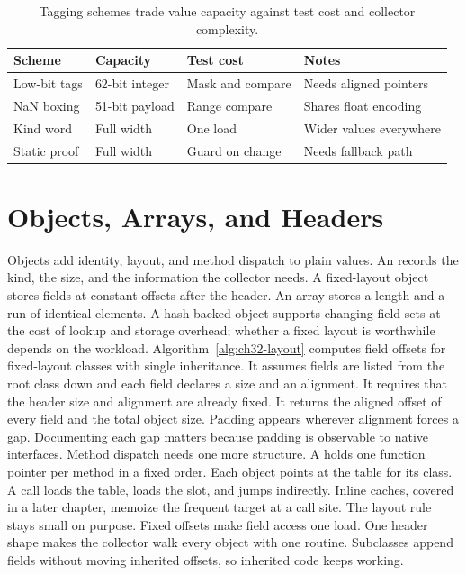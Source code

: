 \begin{table}[htbp]
\centering
\caption{Tagging schemes trade value capacity against test cost and collector complexity.}
\label{tab:ch32-tagging}
\begin{tabular}{llll}
\toprule
Scheme & Capacity & Test cost & Notes \\
\midrule
Low-bit tags & 62-bit integer & Mask and compare & Needs aligned pointers \\
NaN boxing & 51-bit payload & Range compare & Shares float encoding \\
Kind word & Full width & One load & Wider values everywhere \\
Static proof & Full width & Guard on change & Needs fallback path \\
\bottomrule
\end{tabular}
\end{table}

\section{Objects, Arrays, and Headers}\label{sec:ch32-objects}

Objects add identity, layout, and method dispatch to plain values.
An  records the kind, the size, and the information the collector needs.
A fixed-layout object stores fields at constant offsets after the header.
An array stores a length and a run of identical elements.
A hash-backed object supports changing field sets at the cost of lookup and storage overhead; whether a fixed layout is worthwhile depends on the workload.
Algorithm~\ref{alg:ch32-layout} computes field offsets for fixed-layout classes with single inheritance.
It assumes fields are listed from the root class down and each field declares a size and an alignment.
It requires that the header size and alignment are already fixed.
It returns the aligned offset of every field and the total object size.
Padding appears wherever alignment forces a gap.
Documenting each gap matters because padding is observable to native interfaces.
Method dispatch needs one more structure.
A  holds one function pointer per method in a fixed order.
Each object points at the table for its class.
A call loads the table, loads the slot, and jumps indirectly.
Inline caches, covered in a later chapter, memoize the frequent target at a call site.
The layout rule stays small on purpose.
Fixed offsets make field access one load.
One header shape makes the collector walk every object with one routine.
Subclasses append fields without moving inherited offsets, so inherited code keeps working.

